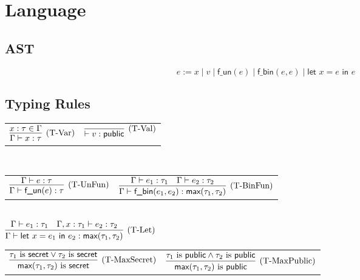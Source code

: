 \documentclass{article}
\begin{document}
\section{Language}
\subsection{AST}

\[ e := x \mid v \mid \textsf{f\_un}(e) \mid \textsf{f\_bin}(e, e) \mid \textsf{let } x = e \textsf{ in } e \]


\subsection{Typing Rules}

\centering
\begin{tabular}{cc}
$\infer[(\text{T-Var})]{
    \Gamma \vdash x : \tau
}{
    x : \tau \in \Gamma
}$ &

$\infer[(\text{T-Val})]{
    \vdash v : \textsf{public}
}{}$
\end{tabular} \\

\vspace{0.5cm}
\centering
\begin{tabular}{cc}
$\infer[(\text{T-UnFun})]{ \Gamma \vdash \textsf{f\_un}(e) : \tau }{ \Gamma \vdash e : \tau }$ &

$\infer[(\text{T-BinFun})]{ 
    \Gamma \vdash \textsf{f\_bin}(e_1, e_2) : \textsf{max}(\tau_1, \tau_2) 
}{
    \Gamma \vdash e_1 : \tau_1
    & \Gamma \vdash e_2 : \tau_2
}$
\end{tabular} \\

\vspace{0.5cm}
\centering
$\infer[(\text{T-Let})]{
    \Gamma \vdash \textsf{let } x = e_1 \textsf{ in } e_2 : \textsf{max}(\tau_1, \tau_2) 
}{
    \Gamma \vdash e_1 : \tau_1
    & \Gamma, x : \tau_1 \vdash e_2 : \tau_2
}$

\vspace{0.5cm}
\centering
\begin{tabular}{cc}
$\infer[(\text{T-MaxSecret})]{ \textsf{max}(\tau_1, \tau_2) \text{ is } \textsf{secret} }{ \tau_1 \text{ is } \textsf{secret} \lor \tau_2 \text{ is } \textsf{secret} }$ &

$\infer[(\text{T-MaxPublic})]{ \textsf{max}(\tau_1, \tau_2) \text{ is } \textsf{public} }{ \tau_1 \text{ is } \textsf{public} \land \tau_2 \text{ is } \textsf{public} }$
\end{tabular}
\end{document}
